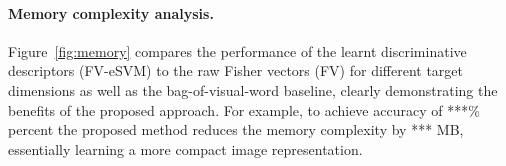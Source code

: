 \documentclass[table]{article} %
\begin{document}
		\paragraph{Memory complexity analysis.}
		Figure~\ref{fig:memory} compares the performance of the learnt discriminative descriptors (FV-eSVM) to the raw Fisher vectors (FV) for different target dimensions as well as the bag-of-visual-word baseline, clearly demonstrating the benefits of the proposed approach. For example, to achieve accuracy of ***\% percent
		the proposed method reduces the memory complexity by *** MB, essentially learning a more compact image representation.  
		
			

\end{document}
